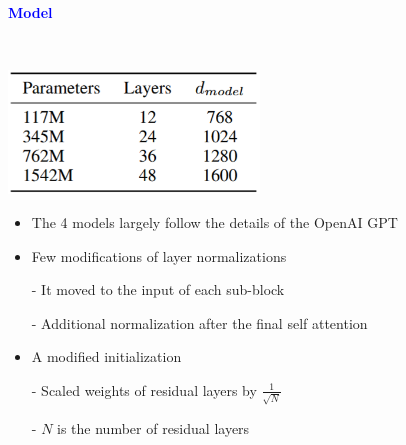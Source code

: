 \documentclass[professionalfont]{beamer}
\begin{document}
\begin{frame}
\begin{center}
    { \textbf{\textcolor{blue}{ {\fontsize{12}{14}\selectfont Model} }} }
\end{center}
\\[0.3cm]
\begin{center}
    \includegraphics[width=0.5\textwidth]{table2.png}
\end{center}

{\fontsize{10}{14}\selectfont 
\begin{itemize}
    \item The 4 models largely follow the details of the OpenAI GPT

    \item Few modifications of layer normalizations

    - It moved to the input of each sub-block

    - Additional normalization after the final self attention

    \item A modified initialization

    - Scaled weights of residual layers by \( \frac{1}{\sqrt{N}} \)

    - \( N \) is the number of residual layers
\end{itemize}
}

\end{frame}
\end{document}
